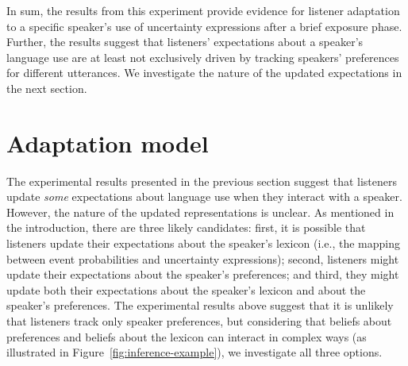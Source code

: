 \documentclass[man, floatsintext]{apa6}
\newcommand{\figref}[1]{Figure~\ref{#1}}
\begin{document}
In sum, the results from this experiment provide evidence for listener adaptation to a specific speaker's use of uncertainty expressions after a brief exposure phase. Further, the results 
suggest that listeners' expectations about a speaker's language use are at least not exclusively driven by tracking speakers' preferences for different utterances. We investigate the nature of the updated expectations
in the next section.



\section{Adaptation model}
\label{sec:model-adapt}



The experimental results presented in the previous section suggest that listeners update
\textit{some} expectations about language use when they interact with a speaker. 
However, the nature of the updated representations is unclear. As mentioned in the introduction, there are three likely candidates:
first, it is possible that listeners update their expectations about the speaker's lexicon 
(i.e., the mapping between event probabilities and uncertainty expressions);  second, listeners
 might  update their expectations about the speaker's preferences; 
and third, they might update both their expectations about the speaker's lexicon 
and about the speaker's preferences. The experimental results above suggest that it is unlikely that listeners track only speaker preferences, but considering
that beliefs about preferences and beliefs about the lexicon can interact in complex ways (as illustrated in \figref{fig:inference-example}), we investigate all three options.
\end{document}
